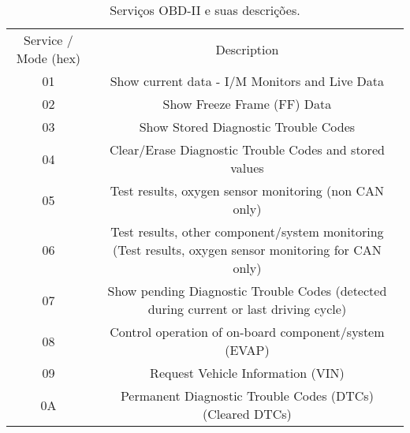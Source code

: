 \begin{table}[h]
 \caption{Serviços OBD-II e suas descrições.}
 \label{Tb:tab1}
 \centering
 
\begin{adjustbox}{width=\textwidth}
 
 \begin{tabular}{cc}
 \rowcolor[HTML]{C0C0C0} 
 {\color[HTML]{FFFFFF} Service / Mode (hex)} & {\color[HTML]{FFFFFF} Description} \\
 
 01 & Show current data - I/M Monitors and Live Data \\
 02 & Show Freeze Frame (FF) Data \\
 03 & Show Stored Diagnostic Trouble Codes \\
 04 & Clear/Erase Diagnostic Trouble Codes and stored values \\
 05 & Test results, oxygen sensor monitoring (non CAN only) \\
 06 & Test results, other component/system monitoring (Test results, oxygen sensor monitoring for CAN only) \\
 07 & Show pending Diagnostic Trouble Codes (detected during current or last driving cycle) \\
 08 & Control operation of on-board component/system (EVAP) \\
 09 & Request Vehicle Information (VIN) \\
 0A & Permanent Diagnostic Trouble Codes (DTCs) (Cleared DTCs) 
 \end{tabular}
\end{adjustbox}
\end{table}